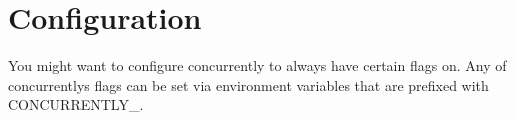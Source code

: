 \chapter{Configuration }
\hypertarget{md__c_1_2xampp_2htdocs_2_g_pagos_ayuntamiento_2node__modules_2concurrently_2docs_2cli_2configuration}{}\label{md__c_1_2xampp_2htdocs_2_g_pagos_ayuntamiento_2node__modules_2concurrently_2docs_2cli_2configuration}
\label{md__c_1_2xampp_2htdocs_2_g_pagos_ayuntamiento_2node__modules_2concurrently_2docs_2cli_2configuration_autotoc_md2238}%
%


You might want to configure concurrently to always have certain flags on. Any of concurrently\textquotesingle{}s flags can be set via environment variables that are prefixed with {\ttfamily CONCURRENTLY\+\_\+}.


\begin{DoxyCode}{0}

\end{DoxyCode}
 